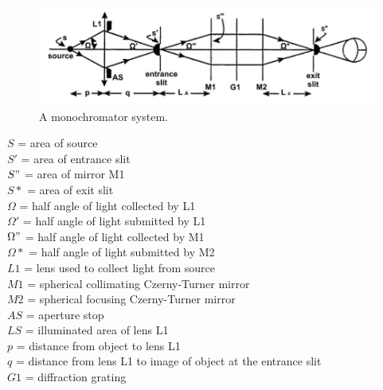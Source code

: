 \begin{figure}[H]
\centering
\includegraphics[width=1\textwidth]{figures/monochromator.PNG}
\caption{A monochromator system. \cite{Horiba_throughput_etendue}}
\label{fig:monochromator}
\end{figure}

$S$ = area of source\\
$S'$ = area of entrance slit\\
$S"$ = area of mirror M1\\
$S*$ = area of exit slit\\
$\Omega$ = half angle of light collected by L1\\
$\Omega'$ = half angle of light submitted by L1\\
$\Omega"$ = half angle of light collected by M1\\
$\Omega*$ = half angle of light submitted by M2\\
$L1$ = lens used to collect light from source\\
$M1$ = spherical collimating Czerny-Turner mirror\\
$M2$ = spherical focusing Czerny-Turner mirror\\
$AS$ = aperture stop\\
$LS$ = illuminated area of lens L1\\
$p$ = distance from object to lens L1\\
$q$ = distance from lens L1 to image of object at the entrance slit\\
$G1$ = diffraction grating


